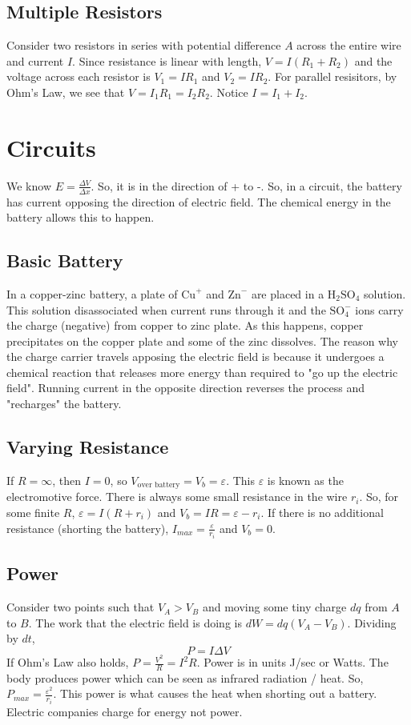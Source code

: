 \documentclass{article}
\begin{document}
\subsection{Multiple Resistors}
Consider two resistors in series with potential difference $A$ across the entire wire and current $I$.
Since resistance is linear with length, $V=I(R_{1}+R_{2})$ and the voltage across each resistor is $V_{1}=IR_{1}$
and $V_{2}=IR_{2}$. For parallel resisitors, by Ohm's Law, we see that $V=I_{1}R_{1}=I_{2}R_{2}$. Notice 
$I=I_{1}+I_{2}$.

\section{Circuits}
We know $E=\frac{\Delta V}{\Delta x}$. So, it is in the direction of + to -. So, in a circuit,
the battery has current opposing the direction of electric field. The chemical energy in the battery
allows this to happen.

\subsection{Basic Battery}
In a copper-zinc battery, a plate of $\text{Cu}^+$ and $\text{Zn}^-$ are placed
in a $\text{H}_{2}\text{SO}_{4}$ solution. This solution disassociated when current runs through it and the
$\text{SO}_{4}^{-}$ ions carry the charge (negative) from copper to zinc plate. As this happens, copper precipitates
on the copper plate and some of the zinc dissolves. The reason why the charge carrier travels apposing the 
electric field is because it undergoes a chemical reaction that releases more energy than required to "go up the electric field".
Running current in the opposite direction reverses the process and "recharges" the battery.

\subsection{Varying Resistance}
If $R=\infty$, then $I=0$, so $V_{\text{over battery}}=V_{b}=\varepsilon$.
This $\varepsilon$ is known as the electromotive force. There is always some small resistance 
in the wire $r_{i}$. So, for some finite $R$, $\varepsilon = I(R+r_{i})$ and $V_{b}=IR=\varepsilon-r_{i}$. If there 
is no additional resistance (shorting the battery), $I_{max}=\frac{\varepsilon}{r_{i}}$ and $V_{b}=0$.

\subsection{Power}
Consider two points such that $V_{A}>V_{B}$ and moving some tiny charge $dq$ from $A$ to $B$.
The work that the electric field is doing is $dW=dq(V_{A}-V_{B})$. Dividing by $dt$,
$$P=I\Delta V$$
If Ohm's Law also holds, $P=\frac{V^{2}}{R}=I^{2}R$. Power is in units J/sec or Watts.
The body produces power which can be seen as infrared radiation / heat. So, $P_{max}=\frac{\varepsilon^{2}}{r_i}$.
This power is what causes the heat when shorting out a battery. Electric companies charge for energy not power.
\end{document}

